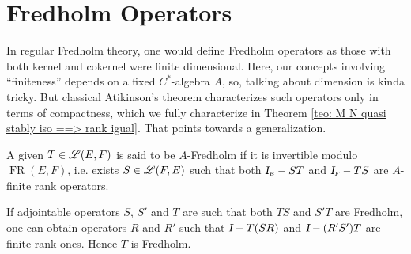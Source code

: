 \chapter{Fredholm Operators}
\label{ch:fredholm operators}

In regular Fredholm theory, one would define Fredholm operators as those with both kernel and cokernel were finite dimensional. Here, our concepts involving ``finiteness'' depends on a fixed $C^*$-algebra $A$, so, talking about dimension is kinda tricky. But classical Atikinson's theorem characterizes such operators only in terms of compactness, which we fully characterize in Theorem \ref{teo: M N quasi stably iso ==> rank igual}. That points towards a generalization. 

\begin{definicao}[$A$-Fredholm]
\label{def:Fredholm operators}
A given $T\in \mathscr L(E,F)$ is said to be $A$-Fredholm if it is invertible modulo $\operatorname{FR}(E,F)$, i.e. exists $S \in \mathscr L(F,E)$ such that both $\sub\Id E - ST$ and $\sub\Id F - TS$ are $A$-finite rank operators.
\end{definicao}

If adjointable operators $S$, $S'$ and $T$ are such that both $TS$ and $S'T$ are Fredholm, one can obtain operators $R$ and $R'$ such that $\textsl{I} - T(SR)$ and $\textsl{I} - (R'S')T$ are finite-rank ones. Hence $T$ is Fredholm. 

